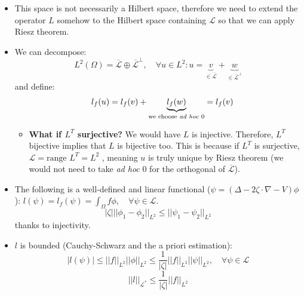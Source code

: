 \documentclass{article}
\begin{document}
\begin{itemize}
\begin{itemize}
        \item This space is not necessarily a Hilbert space, therefore we need to extend the operator $L$ somehow to the Hilbert space containing $\mathcal{L}$ so that we can apply Riesz theorem.

        \item We can decompose:
        \begin{equation}
            L^2(\Omega) = \overline{\mathcal{L}} \oplus \overline{\mathcal{L}}^\perp, \quad \forall u \in L^2: u = \underbrace{v}_{\in \overline{\mathcal{L}}} + \underbrace{w}_{\in \overline{\mathcal{L}}^\perp}
        \end{equation}
        and define:
        \begin{equation}
            \quad l_f(u) = l_f(v) + \underbrace{l_f(w)}_{\text{we choose \textit{ad hoc} 0}} = l_f(v)
        \end{equation}
        \begin{itemize}
            \item \textbf{What if $L^T$ surjective?} We would have $L$ is injective. Therefore, $L^T$  bijective implies that $L$ is bijective too. This is because if $L^T$ is surjective, $\mathcal{L} = \text{range }L^T = L^2 $ , meaning $u$ is truly unique by Riesz theorem (we would not need to take \textit{ad hoc} 0 for the orthogonal of $\overline{\mathcal{L}}$).
        \end{itemize}

        \item The following is a well-defined and linear functional ($\psi = (\Delta - 2\zeta \cdot \nabla - V)\phi$): $l(\psi) = l_f(\psi) = \int_\Omega f \phi, \quad \forall \psi \in \mathcal{L}$.
        \begin{equation}
            |\zeta| ||\phi_1 -  \phi_2 ||_{L^2} \leq ||\psi_1 - \psi_2||_{L^2}
        \end{equation}
        thanks to injectivity.

        \item $l$ is bounded (Cauchy-Schwarz and the a priori estimation):
        \begin{equation}
            |l(\psi)| \leq ||f||_{L^2} ||\phi||_{L^2} \leq \frac{1}{|\zeta|} ||f||_{L^2} ||\psi||_{L^2}, \quad \forall \psi \in \mathcal{L}
        \end{equation}
        \begin{equation}
            ||l||_{\mathcal{L}^*} \leq \frac{1}{|\zeta|} ||f||_{L^2}
        \end{equation}


\end{itemize}
\end{itemize}
\end{document}
